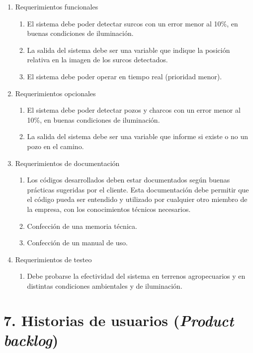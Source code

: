 \documentclass[
11pt, %
]{charter}
\begin{document}
\begin{enumerate}
	\item Requerimientos funcionales
		\begin{enumerate}
			\item El sistema debe poder detectar surcos con un error menor al 10\%, en buenas condiciones de iluminación.
			\item La salida del sistema debe ser una variable que indique la posición relativa en la imagen de los surcos detectados.
			\item El sistema debe poder operar en tiempo real (prioridad menor).
		\end{enumerate}
		
	\item Requerimientos opcionales
		\begin{enumerate}
			\item El sistema debe poder detectar pozos y charcos con un error menor al 10\%, en buenas condiciones de iluminación.
			\item La salida del sistema debe ser una variable que informe si existe o no un pozo en el camino.
		\end{enumerate}
	
	\item Requerimientos de documentación
		\begin{enumerate}
			\item Los códigos desarrollados deben estar documentados según buenas prácticas sugeridas por el cliente. Esta documentación debe permitir que el código pueda ser entendido y utilizado por cualquier otro miembro de la empresa, con los conocimientos técnicos necesarios.
			\item Confección de una memoria técnica.
			\item Confección de un manual de uso.
		\end{enumerate}
	\item Requerimientos de testeo
		\begin{enumerate}
			\item Debe probarse la efectividad del sistema en terrenos agropecuarios y en distintas condiciones ambientales y de iluminación.
		\end{enumerate}
\end{enumerate}


\section{7. Historias de usuarios (\textit{Product backlog})}
\label{sec:backlog}
\end{document}
